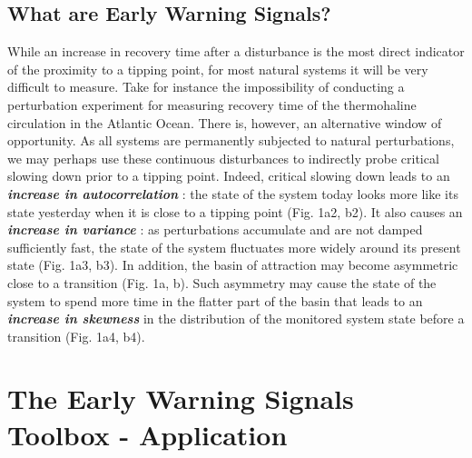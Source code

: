 \documentclass[12pt,a4paper,final]{article}
\begin{document}
\begin{doublespacing}
\subsection{What are Early Warning Signals?}
While an increase in recovery time after a disturbance is the most direct indicator of the proximity to a tipping point, for most natural systems it will be very difficult to measure. Take for instance the impossibility of conducting a perturbation experiment for measuring recovery time of the thermohaline circulation in the Atlantic Ocean. There is, however, an alternative window of opportunity. As all systems are permanently subjected to natural perturbations, we may perhaps use these continuous disturbances to indirectly probe critical slowing down prior to a tipping point. Indeed, critical slowing down leads to an \textit{\textbf{increase in autocorrelation}} \cite{Ives1995,Held2004}: the state of the system today looks more like its state yesterday when it is close to a tipping point (Fig. 1a2, b2). %
It also causes an \textit{\textbf{increase in variance}} \cite{Carpenter2006a}: as perturbations accumulate and are not damped sufficiently fast, the state of the system fluctuates more widely around its present state (Fig. 1a3, b3). In addition, the basin of attraction may become asymmetric close to a transition \cite{Scheffer2009a} (Fig. 1a, b). Such asymmetry may cause the state of the system to spend more time in the flatter part of the basin that leads to an \textit{\textbf{increase in skewness}} \cite{Guttal2008} in the distribution of the monitored system state before a transition (Fig. 1a4, b4).

\section{The Early Warning Signals Toolbox - Application}

\end{doublespacing}
\end{document}
